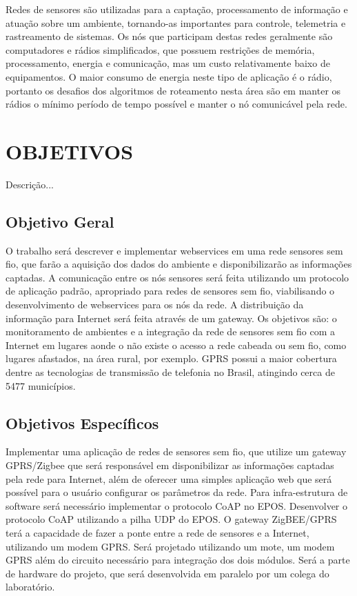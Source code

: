Redes de sensores s\~ao utilizadas para a capta\c{c}\~ao, processamento de informa\c{c}\~ao e atua\c{c}\~ao sobre um ambiente, tornando-as importantes para controle, telemetria e rastreamento de sistemas.
Os n\'os que participam destas redes geralmente s\~ao computadores e r\'adios simplificados, que possuem restri\c{c}\~oes de mem\'oria, processamento, energia e comunica\c{c}\~ao, mas um custo relativamente baixo de equipamentos. O maior consumo de energia neste tipo de aplica\c{c}\~ao \'e o r\'adio, portanto os desafios dos algoritmos de roteamento nesta \'area s\~ao em manter os r\'adios o m\'inimo per\'iodo de tempo poss\'ivel e manter o n\'o comunic\'avel pela rede.

\section{OBJETIVOS}

Descri\c{c}\~ao...

\subsection{Objetivo Geral}

O trabalho ser\'a descrever e implementar webservices em uma rede sensores sem fio, que far\~ao a aquisi\c{c}\~ao dos dados do ambiente e disponibilizar\~ao as informa\c{c}\~oes captadas. A comunica\c{c}\~ao entre os n\'os sensores ser\'a feita utilizando um protocolo de aplica\c{c}\~ao padr\~ao, apropriado para redes de sensores sem fio, viabilisando o desenvolvimento de webservices para os n\'os da rede.
A distribui\c{c}\~ao da informa\c{c}\~ao para Internet ser\'a feita atrav\'es de um gateway. Os objetivos s\~ao: o monitoramento de ambientes e a integra\c{c}\~ao da rede de sensores sem fio com a Internet em lugares aonde o n\~ao existe o acesso a rede cabeada ou sem fio, como lugares afastados, na \'area rural, por exemplo. GPRS possui a maior cobertura dentre as tecnologias de transmiss\~ao de telefonia no Brasil, atingindo cerca de 5477 munic\'ipios.


\subsection{Objetivos Espec\'ificos}

Implementar uma aplica\c{c}\~ao de redes de sensores sem fio, que utilize um gateway GPRS/Zigbee que ser\'a respons\'avel em disponibilizar as informa\c{c}\~oes captadas pela rede para Internet, al\'em de oferecer uma simples aplica\c{c}\~ao web que ser\'a poss\'ivel para o usu\'ario configurar os par\^ametros da rede.
Para infra-estrutura de software ser\'a necess\'ario implementar o protocolo CoAP no EPOS. Desenvolver o protocolo CoAP utilizando a pilha UDP do EPOS.
O gateway ZigBEE/GPRS ter\'a a capacidade de fazer a ponte entre a rede de sensores e a Internet, utilizando um modem GPRS. Ser\'a projetado utilizando um mote, um modem GPRS al\'em do circuito necess\'ario para integra\c{c}\~ao dos dois m\'odulos. Ser\'a a parte de hardware do projeto, que ser\'a desenvolvida em paralelo por um colega do laborat\'orio.
